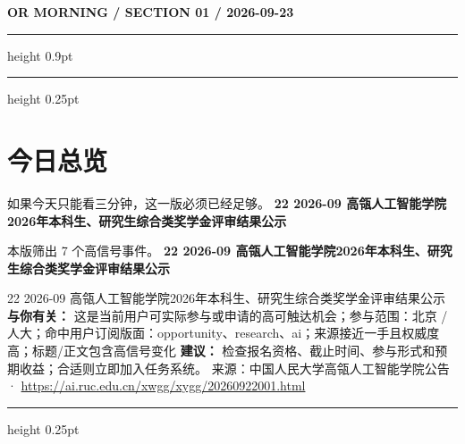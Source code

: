 \documentclass[10.5pt]{ctexart}
\begin{document}
{\small\bfseries OR MORNING / SECTION 01 / 2026-09-23}
\vspace{2mm}
\hrule height 0.9pt
\vspace{1.5mm}
\hrule height 0.25pt
\vspace{4mm}
\section*{今日总览}
{\color{ormuted} 如果今天只能看三分钟，这一版必须已经足够。}
\vspace{2mm}
{\fontsize{25}{29}\selectfont\bfseries 22 2026-09 高瓴人工智能学院2026年本科生、研究生综合类奖学金评审结果公示}\par
\vspace{2mm}
{\large 本版筛出 7 个高信号事件。}
\vspace{3mm}
{\Large\bfseries 22 2026-09 高瓴人工智能学院2026年本科生、研究生综合类奖学金评审结果公示}\par
22 2026-09 高瓴人工智能学院2026年本科生、研究生综合类奖学金评审结果公示
\textbf{与你有关：} 这是当前用户可实际参与或申请的高可触达机会；参与范围：北京 / 人大；命中用户订阅版面：opportunity、research、ai；来源接近一手且权威度高；标题/正文包含高信号变化
\textbf{建议：} 检查报名资格、截止时间、参与形式和预期收益；合适则立即加入任务系统。
{\footnotesize\color{ormuted} 来源：中国人民大学高瓴人工智能学院公告 · \url{https://ai.ruc.edu.cn/xwgg/xygg/20260922001.html}}
\vspace{3mm}
\hrule height 0.25pt
\vspace{3mm}
\end{document}
